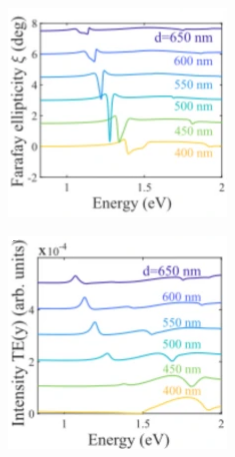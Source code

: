 \documentclass[13pt]{article}
\begin{document}
\begin{figure}[hbt!]
	\begin{subfigure}[]{.49\linewidth}
		\centering
		\includegraphics[width=\linewidth]{Figures/figure4c.png}
		\caption{}
		\label{fig:figure4c}
	\end{subfigure}
	\hfill
	\begin{subfigure}[]{.49\linewidth}
		\centering
		\includegraphics[width=\linewidth]{Figures/figure4d.png}

\end{subfigure}
\end{figure}
\end{document}
